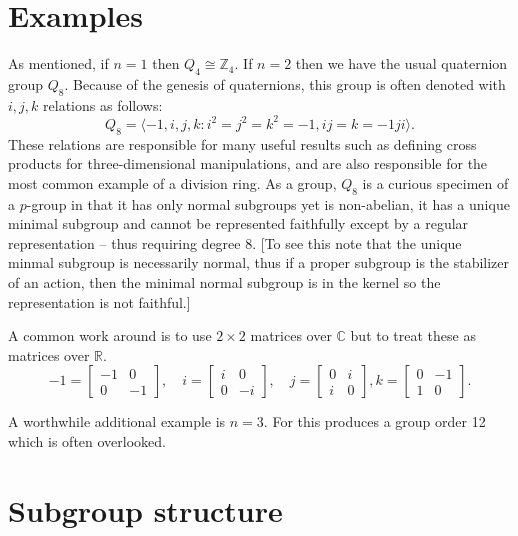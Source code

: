 \documentclass[12pt]{article}
\begin{document}
\section{Examples}

As mentioned, if $n=1$ then $Q_4\cong \mathbb{Z}_4$.  If $n=2$ then we have the
usual quaternion group $Q_8$.  Because of the genesis of quaternions, this group is often denoted with $i,j,k$ relations as follows:
\[Q_8=\langle -1, i,j,k : i^2=j^2=k^2=-1, ij=k=-1 ji\rangle.\]
These relations are responsible for many useful results such as defining cross products for three-dimensional manipulations, and are also responsible for the
most common example of a division ring.  As a group, $Q_8$ is a curious specimen of a $p$-group in that it has only normal subgroups yet is non-abelian, it has a unique minimal subgroup and cannot be represented faithfully except by a regular representation -- thus requiring degree 8.  [To see this note that the unique minmal subgroup is necessarily normal, thus if a proper subgroup is the stabilizer of an action, then the minimal normal subgroup is in the kernel so the representation is not faithful.]

A common work around is to use $2\times 2$ matrices over $\mathbb{C}$ but to treat these as matrices over $\mathbb{R}$.
\[
-1=
\begin{bmatrix}
-1 & 0 \\
0 & -1
\end{bmatrix},
\quad
i=
\begin{bmatrix}
i & 0 \\
0 & -i
\end{bmatrix},
\quad
j=
\begin{bmatrix}
0 & i \\
i & 0
\end{bmatrix},
k=
\begin{bmatrix}
0 & -1 \\
1 & 0
\end{bmatrix}.
\]

A worthwhile additional example is $n=3$.  For this
produces a group order 12 which is often overlooked.

\section{Subgroup structure}
\end{document}
